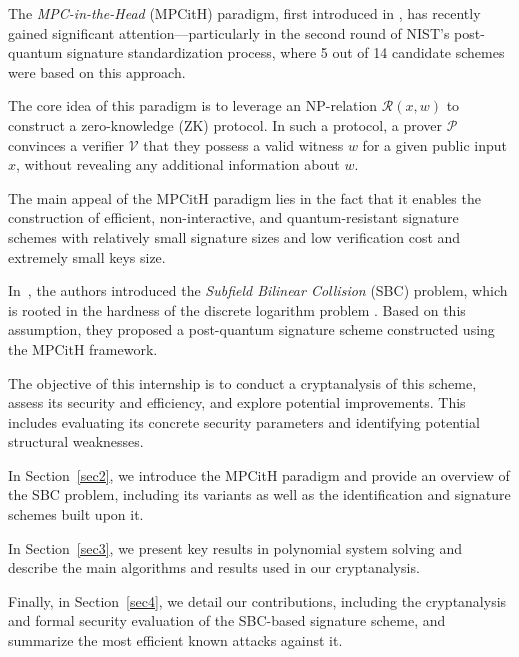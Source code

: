 \documentclass[english]{article}
\begin{document}
		The \emph{MPC-in-the-Head} (MPCitH) paradigm, first introduced in \cite{IKOS07}, has recently gained significant attention—particularly in the second round of NIST’s post-quantum signature standardization process, where 5 out of 14 candidate schemes were based on this approach.
		
		The core idea of this paradigm is to leverage an NP-relation $\mathcal{R}(x, w)$ to construct a zero-knowledge (ZK) protocol. In such a protocol, a prover $\mathcal{P}$ convinces a verifier $\mathcal{V}$ that they possess a valid witness $w$ for a given public input $x$, without revealing any additional information about $w$.
		
		The main appeal of the MPCitH paradigm lies in the fact that it enables the construction of efficient, non-interactive, and quantum-resistant signature schemes with relatively small signature sizes and low verification cost and extremely small keys size.
		
		In~\cite{HJ23}, the authors introduced the \emph{Subfield Bilinear Collision} (SBC) problem, which is rooted in the hardness of the discrete logarithm problem \cite{Joux13}. Based on this assumption, they proposed a post-quantum signature scheme constructed using the MPCitH framework.
		
		The objective of this internship is to conduct a cryptanalysis of this scheme, assess its security and efficiency, and explore potential improvements.
		This includes evaluating its concrete security parameters and identifying potential structural weaknesses.
		
		In Section~\ref{sec2}, we introduce the MPCitH paradigm and provide an overview of the SBC problem, including its variants as well as the identification and signature schemes built upon it. 
		
		In Section~\ref{sec3}, we present key results in polynomial system solving and describe the main algorithms and results used in our cryptanalysis.
		
		Finally, in Section~\ref{sec4}, we detail our contributions, including the cryptanalysis and formal security evaluation of the SBC-based signature scheme, and summarize the most efficient known attacks against it.
	
\end{document}
